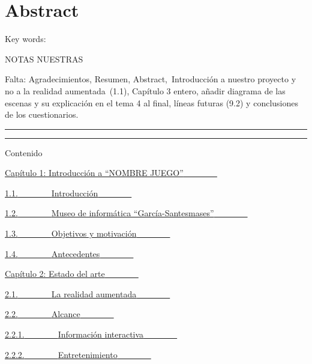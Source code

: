 \section{Abstract}\label{h.74j509ivflvc}

Key words:

NOTAS NUESTRAS

Falta: Agradecimientos, Resumen, Abstract,~Introducción a nuestro
proyecto y no a la realidad aumentada~(1.1), Capítulo 3 entero, añadir
diagrama de las escenas y su explicación en el tema 4 al final, líneas
futuras (9.2) y conclusiones de los cuestionarios.

\begin{center}\rule{3in}{0.4pt}\end{center}

\begin{center}\rule{3in}{0.4pt}\end{center}

Contenido

\hyperref[h.gjdgxs]{Capítulo 1: Introducción a ``NOMBRE
JUEGO''}\hyperref[h.gjdgxs]{~~~~~~~~}

\hyperref[h.30j0zll]{1.1.}\hyperref[h.30j0zll]{~~~~~~~~}\hyperref[h.30j0zll]{Introducción}\hyperref[h.30j0zll]{~~~~~~~~}

\hyperref[h.1fob9te]{1.2.}\hyperref[h.1fob9te]{~~~~~~~~}\hyperref[h.1fob9te]{Museo
de informática ``García-Santesmases''}\hyperref[h.1fob9te]{~~~~~~~~}

\hyperref[h.3znysh7]{1.3.}\hyperref[h.3znysh7]{~~~~~~~~}\hyperref[h.3znysh7]{Objetivos
y motivación}\hyperref[h.3znysh7]{~~~~~~~~}

\hyperref[h.2et92p0]{1.4.}\hyperref[h.2et92p0]{~~~~~~~~}\hyperref[h.2et92p0]{Antecedentes}\hyperref[h.2et92p0]{~~~~~~~~}

\hyperref[h.tyjcwt]{Capítulo 2: Estado del
arte}\hyperref[h.tyjcwt]{~~~~~~~~}

\hyperref[h.3dy6vkm]{2.1.}\hyperref[h.3dy6vkm]{~~~~~~~~}\hyperref[h.3dy6vkm]{La
realidad aumentada}\hyperref[h.3dy6vkm]{~~~~~~~~}

\hyperref[h.1t3h5sf]{2.2.}\hyperref[h.1t3h5sf]{~~~~~~~~}\hyperref[h.1t3h5sf]{Alcance}\hyperref[h.1t3h5sf]{~~~~~~~~}

\hyperref[h.4d34og8]{2.2.1.}\hyperref[h.4d34og8]{~~~~~~~~}\hyperref[h.4d34og8]{Información
interactiva}\hyperref[h.4d34og8]{~~~~~~~~}

\hyperref[h.2s8eyo1]{2.2.2.}\hyperref[h.2s8eyo1]{~~~~~~~~}\hyperref[h.2s8eyo1]{Entretenimiento}\hyperref[h.2s8eyo1]{~~~~~~~~}

